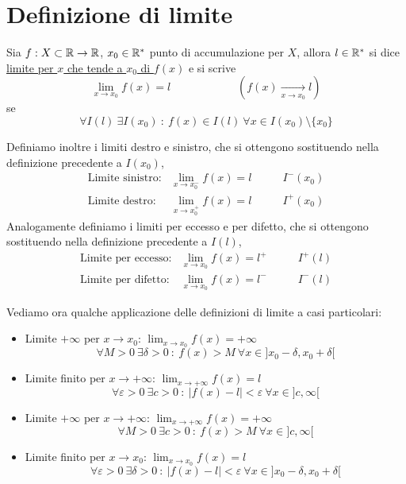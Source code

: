 \documentclass{book}     %
\begin{document}
\section{Definizione di limite}
\begin{boxdef}
    Sia $f:X\subset\mathbb{R}\to \mathbb{R}$, $x_0\in \mathbb{R}^\ast$ punto di accumulazione per $X$, allora $l\in \mathbb{R}^\ast$ si dice \underline{limite per $x$ che tende a $x_0$ di $f(x)$} e si scrive
    \[\lim_{x\to x_0}f(x) = l\qquad\qquad\qquad \left(f(x)\underset{x\to x_0}{\xrightarrow{\hspace{1cm}}}l\right)\]
    se
    \[\forall I(l)\ \exists I(x_0) \ :\ f(x)\in I(l)\ \forall x \in I(x_0)\setminus \{x_0\}\]
\end{boxdef}
Definiamo inoltre i limiti destro e sinistro, che si ottengono sostituendo nella definizione precedente a $I(x_0)$, 
\[\begin{array}{lll}
    \text{Limite sinistro:} & \lim_{x \to x_0^-}f(x) = l \qquad &I^-(x_0)\\
    \text{Limite destro:} & \lim_{x \to x_0^+}f(x) = l & I^ +(x_0)
\end{array}\]
Analogamente definiamo i limiti per eccesso e per difetto, che si ottengono sostituendo nella definizione precedente a $I(l)$, 
\[\begin{array}{lll}
    \text{Limite per eccesso:} & \lim_{x \to x_0}f(x) = l^+\qquad &I^ + (l)\\
    \text{Limite per difetto:} & \lim_{x \to x_0}f(x) = l^-  & I^ - (l)
\end{array}\]

Vediamo ora qualche applicazione delle definizioni di limite a casi particolari:
\begin{itemize}
    \item Limite $+\infty$ per $x\to x_0$: $\lim_{x\to x_0}f(x)=+\infty$
    \[\forall M > 0\ \exists \delta > 0\ :\ f(x) > M\ \forall x \in ] x_0 -\delta, x_0 +\delta[\]
    \item Limite finito per $x\to +\infty$: $\lim_{x\to +\infty}f(x)=l$
    \[\forall \varepsilon > 0\ \exists c > 0\ :\ |f(x) - l |< \varepsilon \ \forall x \in ] c, \infty[\]
    \item Limite $+\infty$ per $x\to +\infty$: $\lim_{x\to +\infty}f(x)=+\infty$
    \[\forall M > 0\ \exists c > 0\ :\ f(x) > M\ \forall x \in ] c,\infty[\]
    \item Limite finito per $x\to x_0$: $\lim_{x\to x_0}f(x)=l$
    \[\forall \varepsilon > 0\ \exists \delta > 0\ :\ |f(x) - l |< \varepsilon \ \forall x \in ] x_0 -\delta, x_0 + \delta[\]
\end{itemize}
\end{document}
